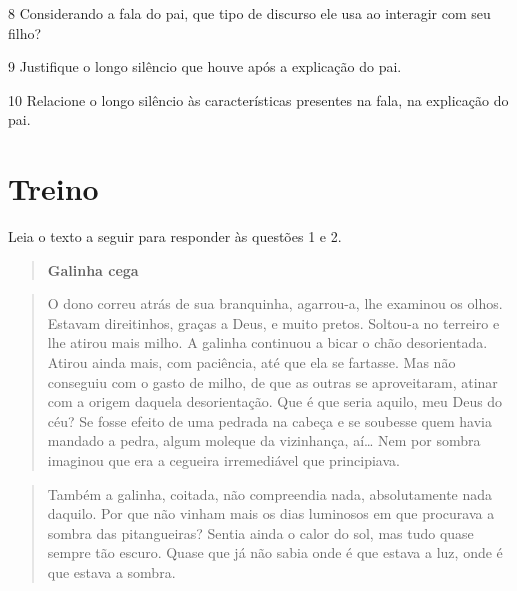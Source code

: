 
\num{8} Considerando a fala do pai, que tipo de discurso ele usa ao interagir com seu filho?


\num{9} Justifique o longo silêncio que houve após a explicação do pai.


\num{10} Relacione o longo silêncio às características presentes na fala, na explicação do
pai.


\pagebreak

\section{Treino}

Leia o texto a seguir para responder às questões 1 e 2.

\begin{quote}
\centering\textbf{Galinha cega}
\end{quote}


\begin{quote}
O dono correu atrás de sua branquinha, agarrou-a, lhe examinou os olhos.
Estavam direitinhos, graças a Deus, e muito pretos. Soltou-a no terreiro
e lhe atirou mais milho. A galinha continuou a bicar o chão
desorientada. Atirou ainda mais, com paciência, até que ela se fartasse.
Mas não conseguiu com o gasto de milho, de que as outras se
aproveitaram, atinar com a origem daquela desorientação. Que é que seria
aquilo, meu Deus do céu? Se fosse efeito de uma pedrada na cabeça e se
soubesse quem havia mandado a pedra, algum moleque da vizinhança,
aí\ldots{} Nem por sombra imaginou que era a cegueira irremediável que
principiava.
\end{quote}

\begin{quote}
Também a galinha, coitada, não compreendia nada, absolutamente nada
daquilo. Por que não vinham mais os dias luminosos em que procurava a
sombra das pitangueiras? Sentia ainda o calor do sol, mas tudo quase
sempre tão escuro. Quase que já não sabia onde é que estava a luz, onde
é que estava a sombra.
\end{quote}

